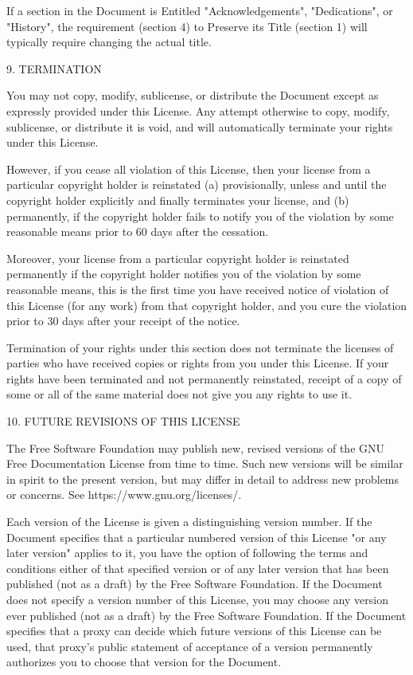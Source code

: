 \documentclass[11pt]{article}
\begin{document}
If a section in the Document is Entitled "Acknowledgements",
"Dedications", or "History", the requirement (section 4) to Preserve
its Title (section 1) will typically require changing the actual
title.


9. TERMINATION

You may not copy, modify, sublicense, or distribute the Document
except as expressly provided under this License.  Any attempt
otherwise to copy, modify, sublicense, or distribute it is void, and
will automatically terminate your rights under this License.

However, if you cease all violation of this License, then your license
from a particular copyright holder is reinstated (a) provisionally,
unless and until the copyright holder explicitly and finally
terminates your license, and (b) permanently, if the copyright holder
fails to notify you of the violation by some reasonable means prior to
60 days after the cessation.

Moreover, your license from a particular copyright holder is
reinstated permanently if the copyright holder notifies you of the
violation by some reasonable means, this is the first time you have
received notice of violation of this License (for any work) from that
copyright holder, and you cure the violation prior to 30 days after
your receipt of the notice.

Termination of your rights under this section does not terminate the
licenses of parties who have received copies or rights from you under
this License.  If your rights have been terminated and not permanently
reinstated, receipt of a copy of some or all of the same material does
not give you any rights to use it.


10. FUTURE REVISIONS OF THIS LICENSE

The Free Software Foundation may publish new, revised versions of the
GNU Free Documentation License from time to time.  Such new versions
will be similar in spirit to the present version, but may differ in
detail to address new problems or concerns.  See
https://www.gnu.org/licenses/.

Each version of the License is given a distinguishing version number.
If the Document specifies that a particular numbered version of this
License "or any later version" applies to it, you have the option of
following the terms and conditions either of that specified version or
of any later version that has been published (not as a draft) by the
Free Software Foundation.  If the Document does not specify a version
number of this License, you may choose any version ever published (not
as a draft) by the Free Software Foundation.  If the Document
specifies that a proxy can decide which future versions of this
License can be used, that proxy's public statement of acceptance of a
version permanently authorizes you to choose that version for the
Document.
\end{document}
